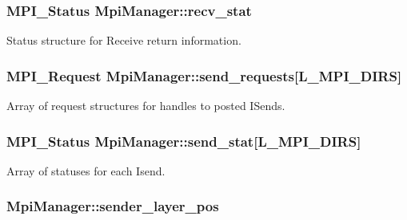 \subsubsection[{\texorpdfstring{recv\+\_\+stat}{recv_stat}}]{\setlength{\rightskip}{0pt plus 5cm}M\+P\+I\+\_\+\+Status Mpi\+Manager\+::recv\+\_\+stat}\hypertarget{class_mpi_manager_a257bc27e8099f1cbf5ac70b80d8eadaa}{}\label{class_mpi_manager_a257bc27e8099f1cbf5ac70b80d8eadaa}


Status structure for Receive return information. 

\subsubsection[{\texorpdfstring{send\+\_\+requests}{send_requests}}]{\setlength{\rightskip}{0pt plus 5cm}M\+P\+I\+\_\+\+Request Mpi\+Manager\+::send\+\_\+requests\mbox{[}{\bf L\+\_\+\+M\+P\+I\+\_\+\+D\+I\+RS}\mbox{]}}\hypertarget{class_mpi_manager_ae4ba6735840e949dff5cd63ab1695ff0}{}\label{class_mpi_manager_ae4ba6735840e949dff5cd63ab1695ff0}


Array of request structures for handles to posted I\+Sends. 

\subsubsection[{\texorpdfstring{send\+\_\+stat}{send_stat}}]{\setlength{\rightskip}{0pt plus 5cm}M\+P\+I\+\_\+\+Status Mpi\+Manager\+::send\+\_\+stat\mbox{[}{\bf L\+\_\+\+M\+P\+I\+\_\+\+D\+I\+RS}\mbox{]}}\hypertarget{class_mpi_manager_a3ccb49ceda719f0c6bb90593a880a730}{}\label{class_mpi_manager_a3ccb49ceda719f0c6bb90593a880a730}


Array of statuses for each Isend. 

\subsubsection[{\texorpdfstring{sender\+\_\+layer\+\_\+pos}{sender_layer_pos}}]{ Mpi\+Manager\+::sender\+\_\+layer\+\_\+pos}\hypertarget{class_mpi_manager_a0cb9f8f024ec0a186374995fb203ea1e}{}\label{class_mpi_manager_a0cb9f8f024ec0a186374995fb203ea1e}


